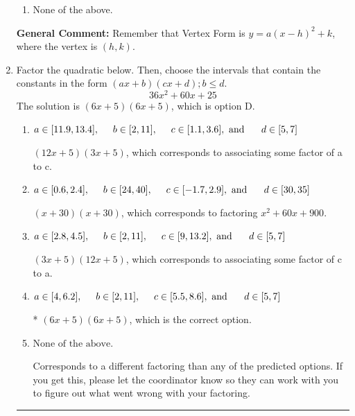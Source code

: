 \documentclass{extbook}[14pt]
\newcommand{\litem}[1]{\item #1

\rule{\textwidth}{0.4pt}}
\begin{document}
\begin{enumerate}
{\begin{enumerate}[label=\Alph*.]
\begin{multicols}{2}
\end{multicols}\item None of the above.\end{enumerate}
\textbf{General Comment:} Remember that Vertex Form is $y = a(x-h)^2+k$, where the vertex is $(h, k)$.
}
\litem{
Factor the quadratic below. Then, choose the intervals that contain the constants in the form $(ax+b)(cx+d); b \leq d.$
\[ 36x^{2} +60 x + 25 \]The solution is \( (6x + 5)(6x + 5) \), which is option D.\begin{enumerate}[label=\Alph*.]
\item \( a \in [11.9, 13.4], \hspace*{5mm} b \in [2, 11], \hspace*{5mm} c \in [1.1, 3.6], \text{ and } \hspace*{5mm} d \in [5, 7] \)

 $(12x + 5)(3x + 5)$, which corresponds to associating some factor of a to c.
\item \( a \in [0.6, 2.4], \hspace*{5mm} b \in [24, 40], \hspace*{5mm} c \in [-1.7, 2.9], \text{ and } \hspace*{5mm} d \in [30, 35] \)

 $(x + 30)(x + 30)$, which corresponds to factoring $x^{2} +60 x + 900$.
\item \( a \in [2.8, 4.5], \hspace*{5mm} b \in [2, 11], \hspace*{5mm} c \in [9, 13.2], \text{ and } \hspace*{5mm} d \in [5, 7] \)

 $(3x + 5)(12x + 5)$, which corresponds to associating some factor of c to a.
\item \( a \in [4, 6.2], \hspace*{5mm} b \in [2, 11], \hspace*{5mm} c \in [5.5, 8.6], \text{ and } \hspace*{5mm} d \in [5, 7] \)

* $(6x + 5)(6x + 5)$, which is the correct option.
\item \( \text{None of the above.} \)

 Corresponds to a different factoring than any of the predicted options. If you get this, please let the coordinator know so they can work with you to figure out what went wrong with your factoring.
\end{enumerate}

}
\end{enumerate}
\end{document}

